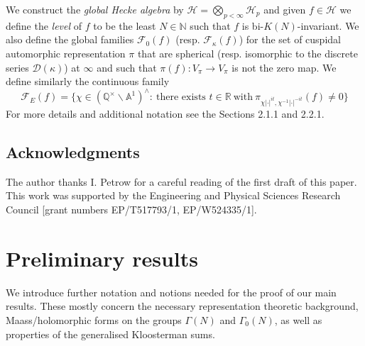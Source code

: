 \documentclass{article}
\numberwithin{equation}{section}
\begin{document}
We construct the \emph{global Hecke algebra} by $\mathcal{H}=\bigotimes_{p<\infty} \mathcal{H}_p$ and given $f \in \mathcal{H}$ we define the \emph{level} of $f$ to be the least $N \in \mathbb{N}$ such that $f$ is bi-$K(N)$-invariant. 
We also define the global families $\mathcal{F}_0(f)$  (resp. $\mathcal{F}_\kappa(f)$) for the set of cuspidal automorphic representation $\pi$ that are spherical (resp. isomorphic to the discrete series $\mathcal{D}(\kappa)$) at $\infty$ and such that $\pi(f): V_\pi \to V_\pi$ is not the zero map. We define similarly the continuous family
\begin{equation}\label{def:continuous-family}
    \mathcal{F}_E(f)=\{\chi \in (\mathbb{Q}^\times \backslash \mathbb{A}^1)^\wedge: \ \text{there exists } t\in\mathbb{R} \ \text{with} \ \pi_{\chi|\cdot|^{it},\chi^{-1}|\cdot|^{-it}}(f)\neq 0 \}
\end{equation}
For more details and additional notation see the Sections 2.1.1 and 2.2.1.

\subsection{Acknowledgments}
The author thanks I. Petrow for a careful reading of the first draft of this paper. \\ This work was supported by the Engineering and Physical Sciences Research Council [grant
numbers EP/T517793/1, EP/W524335/1].

\section{Preliminary results}
We introduce further notation and notions needed for the proof of our main results. These mostly concern the necessary representation theoretic background, Maass/holomorphic forms on the groups $\Gamma(N)$ and $\Gamma_0(N)$, as well as properties of the generalised Kloosterman sums. 
\end{document}
